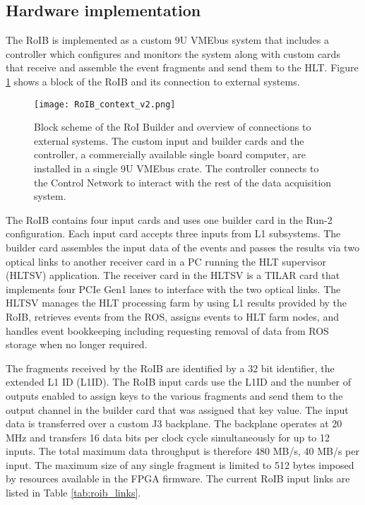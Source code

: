 \subsection{Hardware implementation}\label{sec:roib_current}

The RoIB is implemented as a custom 9U VMEbus system that includes a controller which configures and monitors the system along with custom cards 
that receive and assemble the event fragments and send them to the HLT. Figure \ref{roib_run1} shows a block of the RoIB and 
its connection to external systems.

\begin{figure}[tbp] %
\centering
\texttt{[image: RoIB\_context\_v2.png]}
\caption{Block scheme of the RoI Builder and overview of connections to external systems.  The
custom input and builder cards and the controller, a commercially available single board computer,
are installed in a single 9U VMEbus crate. The controller connects to the Control Network to interact with the rest of the 
data acquisition system.}
\label{roib_run1}
\end{figure}

The RoIB contains four input cards and uses one builder card in the Run-2 configuration. Each input card accepts three inputs from 
L1 subsystems. 
The builder card assembles the input data of the events and passes the results via two optical links 
to another receiver card in a PC running the HLT supervisor (HLTSV) application. The receiver card in the HLTSV is a TILAR card \cite{tilar}
 that implements four PCIe Gen1 lanes to interface with the two optical links. The HLTSV manages the HLT processing farm by using L1 results provided by the RoIB, retrieves events from the ROS, assigns events to HLT farm nodes, and handles event bookkeeping including requesting removal of data from ROS storage when no longer required. 

The fragments received by the RoIB are identified by a 32 bit identifier, the extended L1 ID (L1ID). 
The RoIB input cards use the L1ID and the number of outputs enabled to assign keys to the various fragments and send them to the output channel in the builder card that was 
assigned that key value. The input data is transferred over a custom J3 backplane. The backplane operates at 20 MHz and transfers 16 data bits per 
clock cycle simultaneously for up to 12 inputs. The total maximum data throughput is therefore 480 MB/s, 40 MB/s per input.  
The maximum size of any single fragment is limited to 512 bytes imposed by resources available in the FPGA firmware. The current RoIB input 
links are listed in Table \ref{tab:roib_links}.

